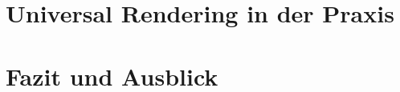 \documentclass[runningheads]{llncs}
\begin{document}

\section{Universal Rendering in der Praxis}
\label{sec:Universal Rendering in der Praxis}



\section{Fazit und Ausblick}
\label{sec:Fazit}



%

\newpage

\end{document}
